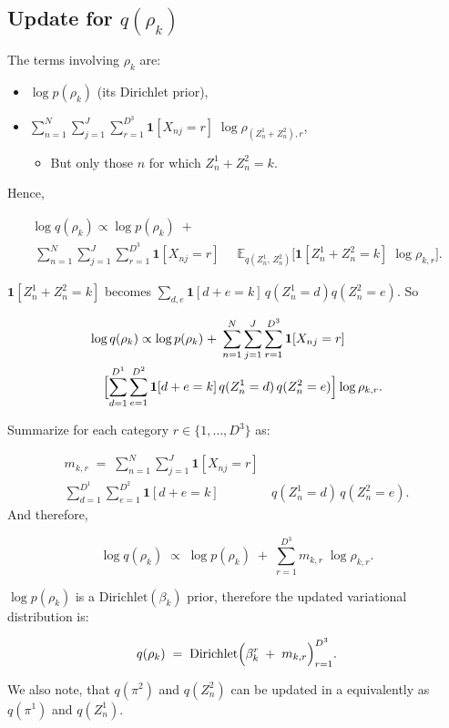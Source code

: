 \documentclass{article}
\begin{document}
\begin{multicols}{2}
    \subsection*{Update for \(q(\rho_k)\)}

    The terms involving \(\rho_k\) are:

    \begin{itemize}
        \item \(\log p(\rho_k)\) (its Dirichlet prior),
        \item \(\sum_{n=1}^N \sum_{j=1}^J \sum_{r=1}^{D^3} \mathbf{1}[X_{nj}=r]\;\log \rho_{(Z_n^1+Z_n^2),r}\),
        \begin{itemize}
            \item But only those \(n\) for which \(Z_n^1 + Z_n^2 = k\).
        \end{itemize}
    \end{itemize}
    Hence,

    
    \begin{align*}
    \log q(\rho_k)
    \propto
    \log p(\rho_k)
    \;+&\\\;
    \sum_{n=1}^N
    \sum_{j=1}^J
    \sum_{r=1}^{D^3}
        \mathbf{1}[X_{nj} = r]
        \;\;&\mathbb{E}_{q(Z_n^1,\,Z_n^2)}\bigl[\mathbf{1}[Z_n^1 + Z_n^2 = k]\;\log \rho_{k,r}\bigr].
    \end{align*}
    

    \(\mathbf{1}[Z_n^1 + Z_n^2 = k]\) becomes \(\sum_{d,e}\mathbf{1}[d+e=k]\,q(Z_n^1=d)q(Z_n^2=e)\).  So

    
    \begin{align*}
    \log q(\rho_k)
    \propto
    \log p(\rho_k)
    \;+&\;
    \sum_{n=1}^N
    \sum_{j=1}^J
    \sum_{r=1}^{D^3}
        \mathbf{1}[X_{nj} = r]
        \\\Bigl[
        \sum_{d=1}^{D^1}\sum_{e=1}^{D^2}
            \mathbf{1}[d+e = k]&\,q(Z_n^1 = d)\,q(Z_n^2 = e)
        \Bigr]
        \log \rho_{k,r}.
    \end{align*}
    
    Summarize for each category \(r\in\{1,\dots,D^3\}\) as:

    \begin{align*}
    m_{k,r}
    \;=\;
    \sum_{n=1}^N
    \sum_{j=1}^J 
    \mathbf{1}[X_{nj} = r]&\\
    \sum_{d=1}^{D^1}\sum_{e=1}^{D^2}
        \mathbf{1}[d+e = k]&\,q(Z_n^1 = d)\,q(Z_n^2 = e).
    \end{align*}
    And therefore,

    \[
    \log q(\rho_k)
    \;\propto\;
    \log p(\rho_k)
    \;+\;
    \sum_{r=1}^{D^3}
    m_{k,r}\;\log \rho_{k,r}.
    \]

    \(\log p(\rho_k)\) is a \(\mathrm{Dirichlet}(\beta_k)\) prior, therefore the updated variational distribution is:

    \[
    q(\rho_k)
    \;=\;
    \mathrm{Dirichlet}\Bigl(
    \beta_k^r
    \;+\;
    m_{k,r}
    \Bigr)_{r=1}^{D^3}.
    \]

    We also note, that $q(\pi^2)$ and $q(Z_n^2)$ can be updated in a equivalently as $q(\pi^1)$ and $q(Z_n^1)$.

\end{multicols}

\clearpage
\end{document}
